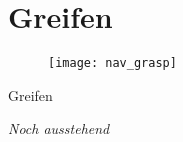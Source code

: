 
\section{Greifen}

\begin{frame}[b]
	\begin{figure}
		\texttt{[image: nav\_grasp]}
	\end{figure}
	\vspace*{0.7cm}
\end{frame}

\begin{frame}[t]{Greifen}
	\vspace*{2cm}
	\centerline{\large\emph{Noch ausstehend}}
\end{frame}

